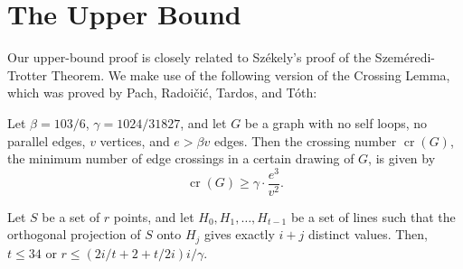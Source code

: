 \documentclass{ws-ijcga}
\DeclareMathOperator{\cn}{cr}
\begin{document}
\section{The Upper Bound}

Our upper-bound proof is closely related to Sz\'ekely's proof of the
Szem\'eredi-Trotter Theorem\cite{s97}.  We make use of the following
version of the Crossing Lemma, which was proved by Pach, Radoi\v{c}i\'{c},
Tardos, and T\'oth\cite{prtt04}:

\begin{lemma}\label{lem:crossing}
Let
$\beta=103/6$, $\gamma = 1024/31827$, and let
$G$ be a graph with no self loops, no parallel edges, $v$ vertices, and
$e > \beta v$ edges.  
Then the crossing number $\cn(G)$, the minimum number of edge crossings
 in a certain drawing of $G$, is given by
\[
  \cn(G) \ge \gamma \cdot \frac{e^3}{v^2}.
\]
\end{lemma}


\begin{lemma}\label{lem:upper-bound-general}
Let %
$S$ be a set of $r$ points, and let
$H_0,H_1,\ldots,H_{t-1}$ be a set of lines such that the orthogonal projection
of $S$ onto $H_{j}$ gives exactly $i+j$ distinct values.  
Then, $t\le 34$ or $r\le (2i/t + 2 + t/2i)  i/\gamma$.
\end{lemma}
\end{document}
